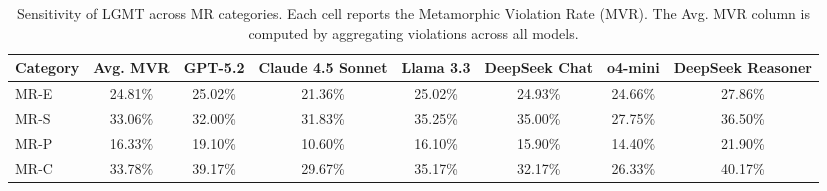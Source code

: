 \begin{table}[pos=htbp]
\centering
\caption{Sensitivity of LGMT across MR categories. Each cell reports the Metamorphic Violation Rate (MVR). The Avg. MVR column is computed by aggregating violations across all models.}\label{tab:rq3}
\begin{tabular}{lccccccc}
\toprule
Category & Avg. MVR & GPT-5.2 & Claude 4.5 Sonnet & Llama 3.3 & DeepSeek Chat & o4-mini & DeepSeek Reasoner \\
\midrule
MR-E & 24.81\% & 25.02\% & 21.36\% & 25.02\% & 24.93\% & 24.66\% & 27.86\% \\
MR-S & 33.06\% & 32.00\% & 31.83\% & 35.25\% & 35.00\% & 27.75\% & 36.50\% \\
MR-P & 16.33\% & 19.10\% & 10.60\% & 16.10\% & 15.90\% & 14.40\% & 21.90\% \\
MR-C & 33.78\% & 39.17\% & 29.67\% & 35.17\% & 32.17\% & 26.33\% & 40.17\% \\
\bottomrule
\end{tabular}
\end{table}